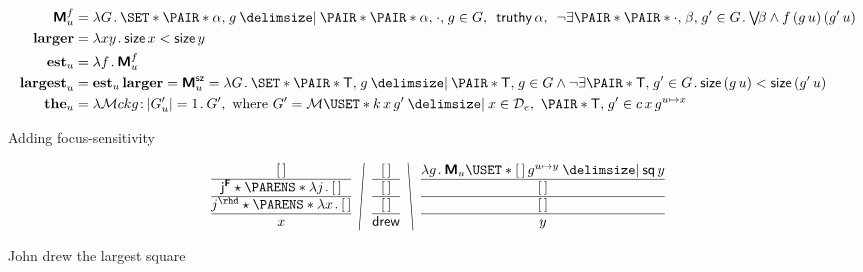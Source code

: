 \documentclass[10pt,fleqn]{article}
\newcommand{\M}{\text{\sffamily\bfseries M}}
\newcommand{\F}{\text{\sffamily\bfseries F}}
\begin{document}
\begin{minipage}[t]{0.6\textwidth} %
\begin{spreadlines}{0em}
\begin{align*}
  \M_u^f &=
  \lambda G \dt
    \set{%
      \pair{\cn{\alpha}}{g}
    \giv
      \pair{\pair{\cn{\alpha}}{\cdot}}{g} \in G
      ,\ \, 
      \cn{truthy}\,\alpha
      ,\ \, 
      \neg\exists\pair{\pair{\cdot}{\beta}}{g'} \in G \dt
        \mathsmaller{\bigvee}\!\beta \land f\,(g\,u)\,(g'\,u)
    } \\
  \textbf{larger} &=
  \lambda xy \dt \cn{size}\,x < \cn{size}\,y \\
  \textbf{est}_u &=
  \lambda f \dt \M_u^f\\
  \textbf{largest}_u &=
  \textbf{est}_u\,\textbf{larger} =
  \M_u^\cn{sz} =
  \lambda G \dt
    \set{%
      \pair{\cn{T}}{g}
    \giv
      \pair{\cn{T}}{g} \in G
      \land
      \neg\exists\pair{\cn{T}}{g'} \in G \dt
        \cn{size}\,(g\,u) < \cn{size}\,(g'\,u)
    } \\
  \textbf{the}_u &=
  \lambda\mathcal{M}ckg \col |G'_u| = 1 \dt G',
  \ \textrm{where} \ 
  G' = \mathcal{M}\uset{%
    k\,x\,g'
  \giv
    x\in \mathcal{D}_e,\ \pair{\cn{T}}{g'} \in c\,x\,g^{u\mapsto x}
  }
\end{align*}
\end{spreadlines}
\end{minipage}
%
%
\begin{minipage}[t]{0.4\textwidth} %
Adding focus-sensitivity

\end{minipage}

\dotbreak

\begin{minipage}[t]{0.6\textwidth} %
\begin{align*}
  \bitttt{\hole}{%
    \cn{j}^\F \star \p{\l j \dt \hole}
  }{%
    j^\rhd \star \p{\l x \dt \hole}
  }{x}
%
\FSL{%
  \bitttt{\hole}{\hole}{\hole}{\cn{drew}}
}
%
\BSL{%
  \bitttt{%
    \lambda g \dt
      \M_u \uset{%
        \hole\,g^{u\mapsto y}
      \giv
        \cn{sq}\,y
      }
  }{\hole}{\hole}{y}
}
\end{align*}  
\end{minipage}
%
%
\begin{minipage}[t]{0.4\textwidth}
John drew the largest square
\end{minipage}
\end{document}
